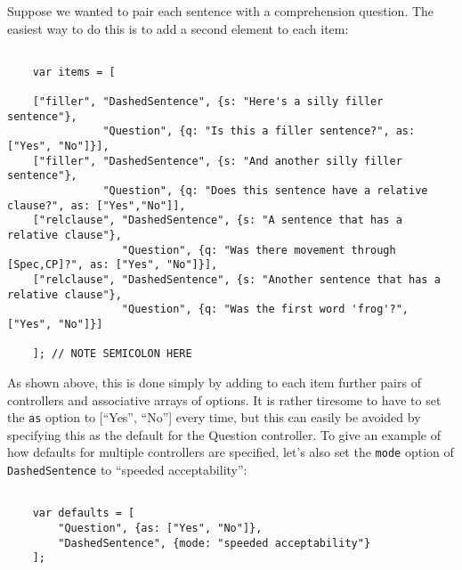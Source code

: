 \documentclass[11pt,letterpaper]{article}
\begin{document}
\smallskip\noindent\normalsize


Suppose we wanted to pair each sentence with a comprehension question.  The
easiest way to do this is to add a second element to each item:
\footnotesize\begin{verbatim}

    var items = [

    ["filler", "DashedSentence", {s: "Here's a silly filler sentence"},
               "Question", {q: "Is this a filler sentence?", as: ["Yes", "No"]}],
    ["filler", "DashedSentence", {s: "And another silly filler sentence"},
               "Question", {q: "Does this sentence have a relative clause?", as: ["Yes","No"]],
    ["relclause", "DashedSentence", {s: "A sentence that has a relative clause"},
                  "Question", {q: "Was there movement through [Spec,CP]?", as: ["Yes", "No"]}],
    ["relclause", "DashedSentence", {s: "Another sentence that has a relative clause"},
                  "Question", {q: "Was the first word 'frog'?", ["Yes", "No"]}]

    ]; // NOTE SEMICOLON HERE
\end{verbatim}

\smallskip\noindent\normalsize

As shown above, this is done simply by adding to each item further pairs of
controllers and associative arrays of options. It is rather tiresome to have to
set the \texttt{as} option to {[}``Yes'', ``No''{]} every time, but this can easily be avoided
by specifying this as the default for the Question controller. To give an
example of how defaults for multiple controllers are specified, let's also set
the \texttt{mode} option of \texttt{DashedSentence} to ``speeded acceptability'':
\footnotesize\begin{verbatim}

    var defaults = [
        "Question", {as: ["Yes", "No"]},
        "DashedSentence", {mode: "speeded acceptability"}
    ];
\end{verbatim}

\smallskip\noindent\normalsize
\end{document}
